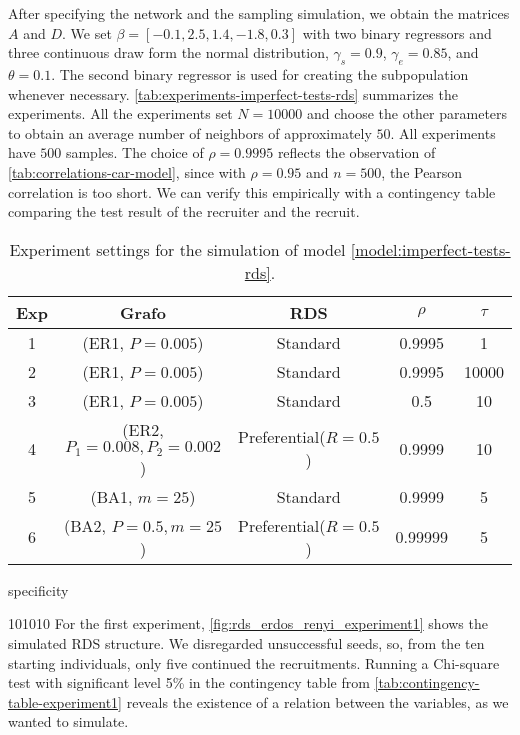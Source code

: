 After specifying the network and the sampling simulation, we obtain the
matrices $A$ and $D$. We set $\beta =
  [-0.1, 2.5, 1.4, -1.8, 0.3]
$ with two binary regressors and three continuous draw form the normal
distribution, $\gamma_s = 0.9$, $\gamma_e = 0.85$, and $\theta = 0.1$.
The second binary regressor is used for creating the subpopulation whenever
necessary. \autoref{tab:experiments-imperfect-tests-rds} summarizes the
experiments. All the experiments set $N=10000$ and choose the other parameters
to obtain an average number of neighbors of approximately $50$. All
experiments have $500$ samples. The choice of $\rho = 0.9995$ reflects the
observation of \autoref{tab:correlations-car-model}, since with $\rho = 0.95$
and $n=500$, the Pearson correlation is too short. We can verify this
empirically with a contingency table comparing the test result of the
recruiter and the recruit.

\begin{table}[htbp]
  \centering
  \caption{\label{tab:experiments-imperfect-tests-rds}Experiment settings for
    the simulation of model \eqref{model:imperfect-tests-rds}.}
  \begin{tabular}{ccccc}
    \hline
    Exp & Grafo                           & RDS                     & $\rho$ & $\tau$ \\ \hline
    1   & (ER1, $P=0.005$)                & Standard                & 0.9995  & 1      \\
    2   & (ER1, $P=0.005$)                & Standard                & 0.9995  & 10000  \\
    3   & (ER1, $P=0.005$)                & Standard                & 0.5    & 10      \\
    4   & (ER2, $P_1=0.008, P_2 = 0.002$) & Preferential($R = 0.5$) & 0.9999  & 10      \\
    5   & (BA1, $m = 25$)                 & Standard                & 0.9999  & 5      \\
    6   & (BA2, $P = 0.5, m = 25$)        & Preferential($R=0.5$)   & 0.99999  & 5      \\ \hline
  \end{tabular}
  specificity
\end{table}
101010
For the first experiment, \autoref{fig:rds_erdos_renyi_experiment1}  shows the
simulated RDS structure. We disregarded unsuccessful seeds, so, from the ten
starting individuals, only five continued the recruitments. Running a
Chi-square test with significant level 5\% in the contingency
table from \autoref{tab:contingency-table-experiment1} reveals the existence
of a relation between the variables, as we wanted to simulate.

